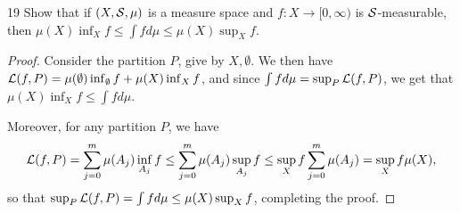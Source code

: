 \begin{exercise}{19}
Show that if $(X, \mathcal{S}, \mu)$ is a measure space and $f: X \to [0,\infty)$ is $\mathcal{S}$-measurable, then $\mu(X) \inf_X f \leq \int f d\mu \leq \mu(X) \sup_X f$.
\end{exercise}
\begin{proof}
Consider the partition $P$, give by $X, \emptyset$.
We then have $\mathcal{L} (f, P) = \mu(\emptyset) \inf_\emptyset f + \mu(X) \inf_X f$, and since $\int f d\mu = \sup_P \mathcal{L}(f,P)$, we get that $\mu(X)\inf_X f \leq \int f d\mu$.

Moreover, for any partition $P$, we have 
\begin{align*}
    \mathcal{L}(f, P) 
    = \sum_{j=0}^m \mu(A_j) \inf_{A_j} f 
    \leq \sum_{j=0}^m \mu(A_j) \sup_{A_j} f 
    \leq \sup_X f \sum_{j=0}^m \mu(A_j)
    = \sup_X f \mu(X),
\end{align*}
so that $\sup_P \mathcal{L}(f, P) = \int f d\mu \leq \mu(X) \sup_X f$, completing the proof.
\end{proof} 

